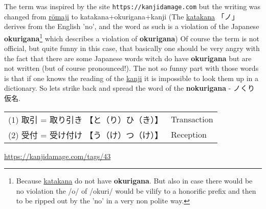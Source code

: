 The term  was inspired by
the site \texttt{https://kanjidamage.com} but the writing was changed from
\hyperref[sec:Romaji]{rōmaji} to katakana+okurigana+kanji (The
        \hyperref[sec:Katakana]{katakana} {「ノ」} derives from the English
        'no', and the word as such is a violation of the Japanese
        \textbf{okurigana}\footnote{Because \hyperref[sec:Katakana]{katakana}
                do not have \textbf{okurigana}. But also in case there would be
no violation the /o/ of /okuri/ would be vilify to a honorific prefix and then
to be ripped out by the 'no' in a very non polite way.} which describes a
violation of \textbf{okurigana}) Of course the term  is not official, but quite
funny in this case, that basically one should be very angry with the fact that
there are some Japanese words witch do have \textbf{okurigana} but are not
written (but of course pronounced!). The not so funny part with those words is
that if one knows the reading of the \hyperref[sec:Kanji]{kanji} it is
impossible to look them up in a dictionary. So lets strike back and spread the
word of the \textbf{nokurigana} - {ノくり仮名}.

\begin{center}\begin{tabular}{ll}
(1) {取引} = {取り引き} {【と（り）ひ（き）】} &  Transaction\\
(2) {受付} = {受け付け} {【う（け）つ（け）】} &  Reception\\
\end{tabular}\end{center}


\Link \href{https://kanjidamage.com/tags/43}{https://kanjidamage.com/tags/43}








